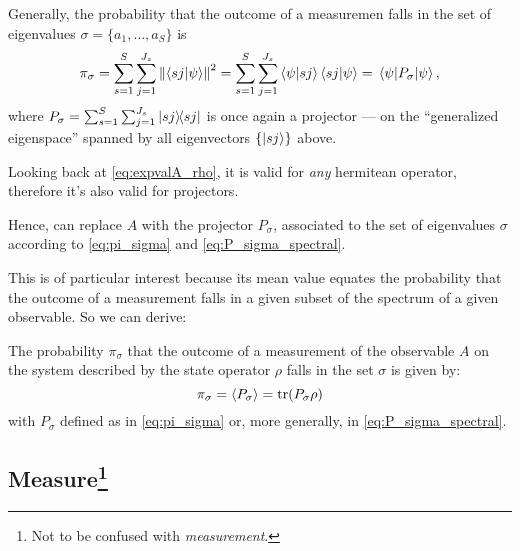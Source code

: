 Generally, the probability that the outcome of a measuremen falls in
the set of eigenvalues $\sigma = \{a_{1}, \dots, a_{S}\}$ is
\begin{equation}\label{eq:pi_sigma}
\pi_{\sigma}  = \sum_{s=1}^{S}\sum_{j=1}^{J_{s}}\norm{\braket{sj}{\psi}}^2
              = \sum_{s=1}^{S}\sum_{j=1}^{J_{s}}\bra{\psi}\ket{sj}\bra{sj}\ket{\psi}
              = \mel{\psi}{P_{\sigma}}{\psi}
              ,
\end{equation}
where $P_{\sigma} = \sum_{s=1}^{S}\sum_{j=1}^{J_{s}}\ketbra{sj}$
is once again a projector --- on the ``generalized eigenspace'' spanned by all
eigenvectors $\{\ket{sj}\}$ above.





Looking back at \eqref{eq:expvalA_rho},
it is valid for \emph{any} hermitean operator,
therefore it's also valid for projectors.

Hence, can replace $A$ with the projector $P_{\sigma}$,
associated to the set of eigenvalues $\sigma$
according to \eqref{eq:pi_sigma} and \eqref{eq:P_sigma_spectral}.

This is of particular interest
because its mean value equates the probability that the outcome of a measurement
falls in a given subset of the spectrum of a given observable.
So we can derive:

\begin{proposition}\label{probability_rho}
  The probability $\pi_{\sigma}$
  that the outcome of a measurement of the observable $A$
  on the system described by the state operator $\rho$
  falls in the set $\sigma$
  is given by:
  \begin{equation}\label{eq:probability_rho}
    \pi_{\sigma} = \expval{P_{\sigma}} = \tr(P_{\sigma}\rho)
  \end{equation}
  with $P_{\sigma}$ defined as in \eqref{eq:pi_sigma}
  or, more generally, in \eqref{eq:P_sigma_spectral}.
\end{proposition}






\subsection[Measure]{Measure\footnote{Not to be confused with \emph{measurement}.}}

